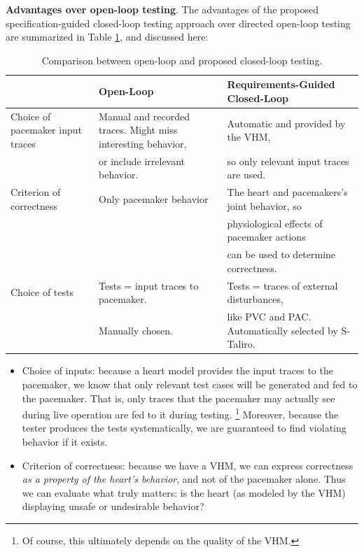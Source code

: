 \textbf{Advantages over open-loop testing}.
The advantages of the proposed specification-guided closed-loop testing approach over directed open-loop testing are summarized in Table \ref{table:CLoverOL}, and discussed here:
\begin{table}
	\centering
	\caption{Comparison between open-loop and proposed closed-loop testing.}
	\begin{tabular}{|l|l|l|}
	\hline                       & Open-Loop    & Requirements-Guided Closed-Loop 
	\\ 
	\hline Choice of pacemaker input traces  
	                & Manual and recorded traces. Might miss interesting behavior, &  Automatic and provided by the VHM,
	\\ 
					& or include irrelevant behavior. &  so only relevant input traces are used.
	\\
	\hline Criterion of correctness    & Only pacemaker behavior & The heart and pacemakers's joint behavior, so 
	\\
	                &                  & physiological effects of pacemaker actions
	\\
	                &                  &  can be used to determine correctness.                   
	\\ 
	\hline Choice of tests & Tests = input traces to pacemaker.  & Tests = traces of external disturbances, 
	\\
	                & Manually chosen.  & like PVC and PAC. Automatically selected by S-Taliro.
	\\
	\hline 
\end{tabular}
\label{table:CLoverOL}
\end{table}

\begin{itemize}
	\item Choice of inputs: because a heart model provides the input traces to the pacemaker, we know that only relevant test cases will be generated and fed to the pacemaker. 
	That is, only traces that the pacemaker may actually see during live operation are fed to it during testing. 
	\footnote{Of course, this ultimately depends on the quality of the VHM.}
	Moreover, because the tester produces the tests systematically, we are guaranteed to find violating behavior if it exists.
	\item Criterion of correctness: because we have a VHM, we can express correctness \emph{as a property of the heart's behavior}, and not of the pacemaker alone. 
	Thus we can evaluate what truly matters: is the heart (as modeled by the VHM) displaying unsafe or undesirable behavior?
\end{itemize}

